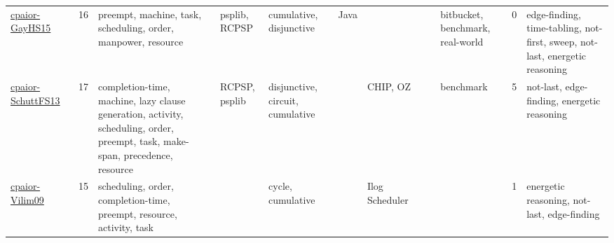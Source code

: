 {\begin{longtable}{p{3cm}rp{4cm}p{1.5cm}p{2cm}p{1.5cm}p{1.5cm}p{1.5cm}p{1.5cm}p{2cm}rp{1.5cm}}
\href{papers/cpaior-GayHS15.pdf}{cpaior-GayHS15}~\cite{cpaior-GayHS15} & 16 & preempt, machine, task, scheduling, order, manpower, resource & psplib, RCPSP & cumulative, disjunctive & Java &  &  &  & bitbucket, benchmark, real-world & 0 & edge-finding, time-tabling, not-first, sweep, not-last, energetic reasoning\\
\href{papers/cpaior-SchuttFS13.pdf}{cpaior-SchuttFS13}~\cite{cpaior-SchuttFS13} & 17 & completion-time, machine, lazy clause generation, activity, scheduling, order, preempt, task, make-span, precedence, resource & RCPSP, psplib & disjunctive, circuit, cumulative &  & CHIP, OZ &  &  & benchmark & 5 & not-last, edge-finding, energetic reasoning\\
\href{papers/cpaior-Vilim09.pdf}{cpaior-Vilim09}~\cite{cpaior-Vilim09} & 15 & scheduling, order, completion-time, preempt, resource, activity, task &  & cycle, cumulative &  & Ilog Scheduler &  &  &  & 1 & energetic reasoning, not-last, edge-finding\\
\end{longtable}
}

